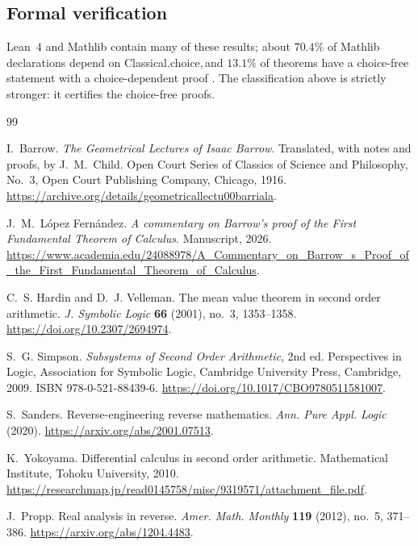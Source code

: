 \documentclass[11pt,reqno]{amsart}
\newcommand{\comma}{,\,\allowbreak}
\theoremstyle{redplain}
\begin{document}
\subsection{Formal verification}
Lean~4 and Mathlib \cite{Lean4} contain many of these results; about $70.4\%$ of Mathlib declarations depend on \textsf{Classical.choice}\comma and $13.1\%$ of theorems have a choice-free statement with a choice-dependent proof \cite{Crossref2026}. The classification above is strictly stronger: it certifies the choice-free proofs.

\begin{thebibliography}{99}
	
	I.~Barrow.
	\newblock \emph{The Geometrical Lectures of Isaac Barrow}.
	\newblock Translated, with notes and proofs, by J.~M.~Child. Open Court
	Series of Classics of Science and Philosophy, No.~3, Open Court
	Publishing Company, Chicago, 1916.
	\newblock \url{https://archive.org/details/geometricallectu00barriala}.
	
	J.~M.~L\'opez Fern\'andez.
	\newblock \emph{A commentary on Barrow's proof of the First Fundamental
		Theorem of Calculus}.
	\newblock Manuscript, 2026.
	\newblock
	\url{https://www.academia.edu/24088978/A_Commentary_on_Barrow_s_Proof_of_the_First_Fundamental_Theorem_of_Calculus}.
	
	 C.~S. Hardin and D.~J. Velleman.
	\newblock The mean value theorem in second order arithmetic.
	\newblock \emph{J. Symbolic Logic} \textbf{66} (2001), no.~3, 1353--1358.
	\newblock \url{https://doi.org/10.2307/2694974}.
	
	 S.~G. Simpson.
	\newblock \emph{Subsystems of Second Order Arithmetic}, 2nd ed.
	\newblock Perspectives in Logic, Association for Symbolic Logic,
	Cambridge University Press, Cambridge, 2009.
	\newblock ISBN 978-0-521-88439-6.
	\newblock \url{https://doi.org/10.1017/CBO9780511581007}.
	
	 S.~Sanders.
	\newblock Reverse-engineering reverse mathematics.
	\newblock \emph{Ann. Pure Appl. Logic} (2020).
	\newblock \url{https://arxiv.org/abs/2001.07513}.
	
	 K.~Yokoyama.
	\newblock Differential calculus in second order arithmetic.
	\newblock Mathematical Institute, Tohoku University, 2010.
	\newblock
	\url{https://researchmap.jp/read0145758/misc/9319571/attachment_file.pdf}.
	
	 J.~Propp.
	\newblock Real analysis in reverse.
	\newblock \emph{Amer. Math. Monthly} \textbf{119} (2012), no.~5, 371--386.
	\newblock \url{https://arxiv.org/abs/1204.4483}.
	

\end{thebibliography}
\end{document}
